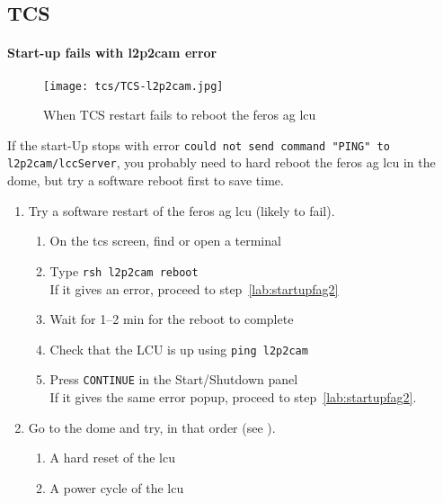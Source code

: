 \documentclass[11pt,fleqn,a4paper]{book}
\begin{document}
\subsection{TCS}
\paragraph{Start-up fails with \gls{l2p2cam} error}
\begin{figure}
    \centering
    \texttt{[image: tcs/TCS-l2p2cam.jpg]}
    \caption[TCS restart failing to reboot the FEROS AG LCU]{When TCS restart fails to reboot the \gls{feros} \gls{ag} \gls{lcu}}
\end{figure}

If the start-Up stops with error \texttt{could not send command "PING" to l2p2cam/lccServer}, you probably need to hard reboot the  \gls{feros} \gls{ag} \gls{lcu} in the dome, but try a software reboot first to save time.

    \begin{enumerate}
        \item Try a software restart of the \gls{feros} \gls{ag} \gls{lcu} (likely to fail).
        \begin{enumerate}
            \item On the \gls{tcs} screen, find or open a terminal
            \item Type \texttt{rsh \gls{l2p2cam} reboot}\\
                  If it gives an error, proceed to step~\ref{lab:startupfag2}
            \item Wait for 1--2 min for the reboot to complete 
            \item Check that the LCU is up using \texttt{ping \gls{l2p2cam}}
            \item Press \texttt{CONTINUE} in the Start/Shutdown panel\\
                  If it gives the same error popup, proceed to step~\ref{lab:startupfag2}. 
        \end{enumerate}
        \item\label{lab:startupfag2} Go to the dome and try, in that order (see ).
            \begin{enumerate}
            \item A hard reset of the \gls{lcu}
            \item A \gls{power cycle} of the \gls{lcu}
            \end{enumerate}
    \end{enumerate}
\end{document}
